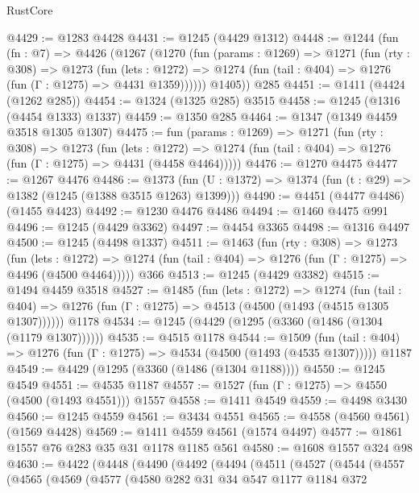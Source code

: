 \begin{lexlean}{RustCore}
\begin{coremodule}
@4429 := @1283 @4428
@4431 := @1245 (@4429 @1312)
@4448 := @1244
    (fun (fn : @7) =>
    @4426
      (@1267
        (@1270
          (fun (params : @1269) =>
          @1271
            (fun (rty : @308) =>
            @1273
              (fun (lets : @1272) =>
              @1274 (fun (tail : @404) => @1276 (fun (Γ : @1275) => @4431 @1359))))))
        @1405))
    @285
@4451 := @1411 (@4424 (@1262 @285))
@4454 := @1324 (@1325 @285) @3515
@4458 := @1245 (@1316 (@4454 @1333) @1337)
@4459 := @1350 @285
@4464 := @1347 (@1349 @4459 @3518 @1305 @1307)
@4475 := fun (params : @1269) =>
  @1271
    (fun (rty : @308) =>
    @1273
      (fun (lets : @1272) =>
      @1274 (fun (tail : @404) => @1276 (fun (Γ : @1275) => @4431 (@4458 @4464)))))
@4476 := @1270 @4475
@4477 := @1267 @4476
@4486 := @1373 (fun (U : @1372) => @1374 (fun (t : @29) => @1382 (@1245 (@1388 @3515 @1263) @1399)))
@4490 := @4451 (@4477 @4486) (@1455 @4423)
@4492 := @1230 @4476 @4486
@4494 := @1460 @4475 @991
@4496 := @1245 (@4429 @3362)
@4497 := @4454 @3365
@4498 := @1316 @4497
@4500 := @1245 (@4498 @1337)
@4511 := @1463
    (fun (rty : @308) =>
    @1273
      (fun (lets : @1272) =>
      @1274 (fun (tail : @404) => @1276 (fun (Γ : @1275) => @4496 (@4500 @4464)))))
    @366
@4513 := @1245 (@4429 @3382)
@4515 := @1494 @4459 @3518
@4527 := @1485
    (fun (lets : @1272) =>
    @1274
      (fun (tail : @404) => @1276 (fun (Γ : @1275) => @4513 (@4500 (@1493 (@4515 @1305 @1307))))))
    @1178
@4534 := @1245 (@4429 (@1295 (@3360 (@1486 (@1304 (@1179 @1307))))))
@4535 := @4515 @1178
@4544 := @1509
    (fun (tail : @404) => @1276 (fun (Γ : @1275) => @4534 (@4500 (@1493 (@4535 @1307)))))
    @1187
@4549 := @4429 (@1295 (@3360 (@1486 (@1304 @1188))))
@4550 := @1245 @4549
@4551 := @4535 @1187
@4557 := @1527 (fun (Γ : @1275) => @4550 (@4500 (@1493 @4551))) @1557
@4558 := @1411 @4549
@4559 := @4498 @3430
@4560 := @1245 @4559
@4561 := @3434 @4551
@4565 := @4558 (@4560 @4561) (@1569 @4428)
@4569 := @1411 @4559 @4561 (@1574 @4497)
@4577 := @1861 @1557 @76 @283 @35 @31 @1178 @1185 @561
@4580 := @1608 @1557 @324 @98
@4630 := @4422
    (@4448
      (@4490
        (@4492
          (@4494
            (@4511
              (@4527
                (@4544
                  (@4557
                    (@4565
                      (@4569
                        (@4577
                          (@4580
                            @282
                            @31
                            @34
                            @547
                            @1177
                            @1184
                            @372

\end{coremodule}
\end{lexlean}
